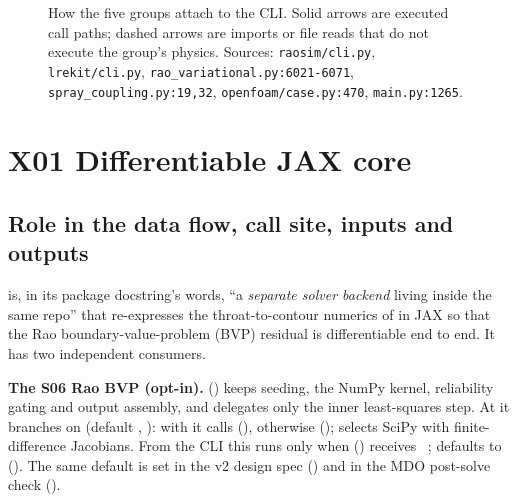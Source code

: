 \begin{figure}[H]
\caption{How the five groups attach to the CLI. Solid arrows are executed call paths; dashed arrows are imports or file reads that do not execute the group's physics. Sources: \texttt{raosim/cli.py}, \texttt{lrekit/cli.py}, \texttt{rao\_variational.py:6021-6071}, \texttt{spray\_coupling.py:19,32}, \texttt{openfoam/case.py:470}, \texttt{main.py:1265}.}\label{fig:x-relations}
\end{figure}

\section{X01 Differentiable JAX core}\label{sec:x01-jax}

\subsection{Role in the data flow, call site, inputs and outputs}

 is, in its package docstring's words, ``a \emph{separate solver backend} living inside the same repo'' that re-expresses the throat-to-contour numerics of  in JAX so that the Rao boundary-value-problem (BVP) residual is differentiable end to end. It has two independent consumers.

\textbf{The S06 Rao BVP (opt-in).}  () keeps seeding, the NumPy kernel, reliability gating and output assembly, and delegates only the inner least-squares step. At  it branches on  (default , ): with  it calls  (), otherwise  ();  selects SciPy  with finite-difference Jacobians. From the CLI this runs only when  () receives ~;  defaults to  (). The same  default is set in the v2 design spec () and in the MDO post-solve check  ().

